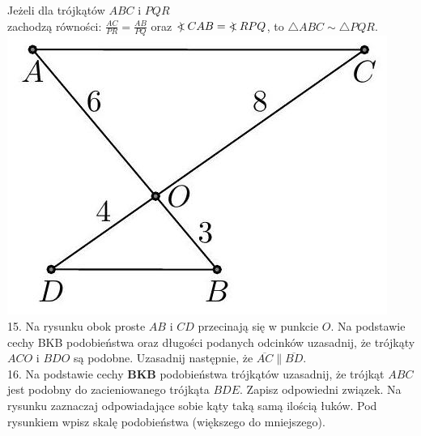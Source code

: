 \documentclass[10pt]{article}
\newcommand\Varangle{\mathop{{<\!\!\!\!\!\text{\small)}}\:}\nolimits}
\begin{document}
Jeżeli dla trójkątów \(A B C\) i \(P Q R\)\\
zachodzą równości: \(\frac{A C}{P R}=\frac{A B}{P Q}\) oraz \(\Varangle C A B=\Varangle R P Q\), to \(\triangle A B C \sim \triangle P Q R\).\\
\includegraphics[max width=\textwidth, center]{2024_11_21_e9b4faa005d5be2cc318g-023(2)}\\
15. Na rysunku obok proste \(A B\) i \(C D\) przecinają się w punkcie \(O\). Na podstawie cechy BKB podobieństwa oraz długości podanych odcinków uzasadnij, że trójkąty \(A C O\) i \(B D O\) są podobne. Uzasadnij następnie, że \(\overline{A C} \| \overline{B D}\).\\
16. Na podstawie cechy \(\mathbf{B K B}\) podobieństwa trójkątów uzasadnij, że trójkąt \(A B C\) jest podobny do zacieniowanego trójkąta \(B D E\). Zapisz odpowiedni związek. Na rysunku zaznaczaj odpowiadające sobie kąty taką samą ilością łuków. Pod rysunkiem wpisz skalę podobieństwa (większego do mniejszego).\\
\end{document}
